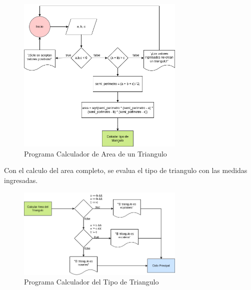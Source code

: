 \documentclass{article}
\begin{document}
\begin{figure}[h]
    \centering
    \includegraphics[width=8cm]{triangulo_area}
    \caption{Programa Calculador de Area de un Triangulo}
\end{figure}

Con el calculo del area completo, se evalua el tipo de triangulo con las medidas ingresadas.

\begin{figure}[h]
    \centering
    \includegraphics[width=8cm]{triangulo_tipo}
    \caption{Programa Calculador del Tipo de Triangulo}
\end{figure}
\end{document}
